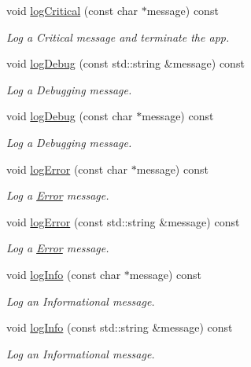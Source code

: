 \begin{DoxyCompactItemize}
void \mbox{\hyperlink{classrev_1_1_object_a12b1396b74c4c4c1ff2f25935977937f}{log\+Critical}} (const char $\ast$message) const
\begin{DoxyCompactList}\small\item\em Log a Critical message and terminate the app. \end{DoxyCompactList}\item 
void \mbox{\hyperlink{classrev_1_1_object_a3435060b2a2904fef41e9ee50144d076}{log\+Debug}} (const std\+::string \&message) const
\begin{DoxyCompactList}\small\item\em Log a Debugging message. \end{DoxyCompactList}\item 
void \mbox{\hyperlink{classrev_1_1_object_a5b0b84e3b2afd5ecd44bb6c78859e38b}{log\+Debug}} (const char $\ast$message) const
\begin{DoxyCompactList}\small\item\em Log a Debugging message. \end{DoxyCompactList}\item 
void \mbox{\hyperlink{classrev_1_1_object_a4559ef458b76ee917de6112f5a9dfdca}{log\+Error}} (const char $\ast$message) const
\begin{DoxyCompactList}\small\item\em Log a \mbox{\hyperlink{class_error}{Error}} message. \end{DoxyCompactList}\item 
void \mbox{\hyperlink{classrev_1_1_object_a773c27fc0e8e9c911021763c6dba144d}{log\+Error}} (const std\+::string \&message) const
\begin{DoxyCompactList}\small\item\em Log a \mbox{\hyperlink{class_error}{Error}} message. \end{DoxyCompactList}\item 
void \mbox{\hyperlink{classrev_1_1_object_a6dd4b6c7863018562f5820bdcac3612c}{log\+Info}} (const char $\ast$message) const
\begin{DoxyCompactList}\small\item\em Log an Informational message. \end{DoxyCompactList}\item 
void \mbox{\hyperlink{classrev_1_1_object_ae75e2d9d3dc2c7ff4407d5be4075b348}{log\+Info}} (const std\+::string \&message) const
\begin{DoxyCompactList}\small\item\em Log an Informational message. \end{DoxyCompactList}\item 

\end{DoxyCompactItemize}
